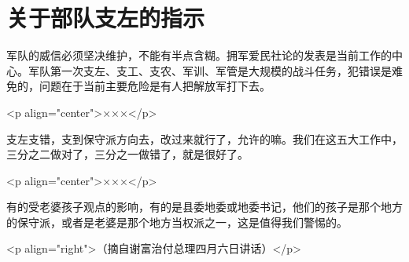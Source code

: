 \section[关于部队支左的指示（一九六七年四月）]{关于部队支左的指示}


军队的威信必须坚决维护，不能有半点含糊。拥军爱民社论的发表是当前工作的中心。军队第一次支左、支工、支农、军训、军管是大规模的战斗任务，犯错误是难免的，问题在于当前主要危险是有人把解放军打下去。

<p align="center">×××</p>

支左支错，支到保守派方向去，改过来就行了，允许的嘛。我们在这五大工作中，三分之二做对了，三分之一做错了，就是很好了。

<p align="center">×××</p>

有的受老婆孩子观点的影响，有的是县委地委或地委书记，他们的孩子是那个地方的保守派，或者是老婆是那个地方当权派之一，这是值得我们警惕的。

<p align="right">（摘自谢富治付总理四月六日讲话）</p>


